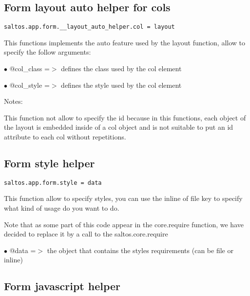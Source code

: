 \documentclass[a4paper]{book}
\begin{document}
\subsection{Form layout auto helper for cols}

\begin{lstlisting}
saltos.app.form.__layout_auto_helper.col = layout
\end{lstlisting}

This functions implements the auto feature used by the layout function, allow to specify the
follow arguments:

\begin{compactitem}
\item[\color{myblue}$\bullet$] @col\_class       =$>$ defines the class used by the col element
\item[\color{myblue}$\bullet$] @col\_style       =$>$ defines the style used by the col element
\end{compactitem}

Notes:

This function not allow to specify the id because in this functions, each object of the
layout is embedded inside of a col object and is not suitable to put an id attribute
to each col without repetitions.

\hypertarget{toc410}{}
\subsection{Form style helper}

\begin{lstlisting}
saltos.app.form.style = data
\end{lstlisting}

This function allow to specify styles, you can use the inline of file key to specify
what kind of usage do you want to do.

Note that as some part of this code appear in the core.require function, we have decided
to replace it by a call to the saltos.core.require

\begin{compactitem}
\item[\color{myblue}$\bullet$] @data =$>$ the object that contains the styles requirements (can be file or inline)
\end{compactitem}

\hypertarget{toc411}{}
\subsection{Form javascript helper}
\end{document}
